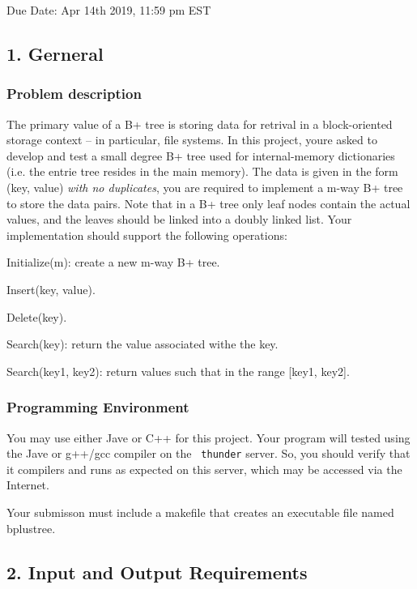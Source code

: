 Due Date\+: Apr 14th 2019, 11\+:59 pm E\+ST

\subsection*{1. Gerneral}

\subsubsection*{Problem description}

The primary value of a B+ tree is storing data for retrival in a block-\/oriented storage context -- in particular, file systems. In this project, you\textquotesingle{}re asked to develop and test a small degree B+ tree used for internal-\/memory dictionaries (i.\+e. the entrie tree resides in the main memory). The data is given in the form (key, value) {\itshape with no duplicates}, you are required to implement a m-\/way B+ tree to store the data pairs. Note that in a B+ tree only leaf nodes contain the actual values, and the leaves should be linked into a doubly linked list. Your implementation should support the following operations\+:
\begin{DoxyEnumerate}
\item Initialize(m)\+: create a new m-\/way B+ tree.
\item Insert(key, value).
\item Delete(key).
\item Search(key)\+: return the value associated withe the key.
\item Search(key1, key2)\+: return values such that in the range [key1, key2].
\end{DoxyEnumerate}

\subsubsection*{Programming Environment}

You may use either Jave or C++ for this project. Your program will tested using the Jave or g++/gcc compiler on the {\texttt{ thunder}} server. So, you should verify that it compilers and runs as expected on this server, which may be accessed via the Internet.

Your submisson must include a makefile that creates an executable file named bplustree.

\subsection*{2. Input and Output Requirements}

